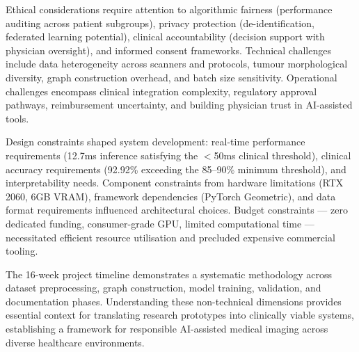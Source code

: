 Ethical considerations require attention to algorithmic fairness (performance auditing across patient subgroups), privacy protection (de-identification, federated learning potential), clinical accountability (decision support with physician oversight), and informed consent frameworks. Technical challenges include data heterogeneity across scanners and protocols, tumour morphological diversity, graph construction overhead, and batch size sensitivity. Operational challenges encompass clinical integration complexity, regulatory approval pathways, reimbursement uncertainty, and building physician trust in AI-assisted tools.

Design constraints shaped system development: real-time performance requirements (12.7ms inference satisfying the $<$50ms clinical threshold), clinical accuracy requirements (92.92\% exceeding the 85--90\% minimum threshold), and interpretability needs. Component constraints from hardware limitations (RTX 2060, 6GB VRAM), framework dependencies (PyTorch Geometric), and data format requirements influenced architectural choices. Budget constraints — zero dedicated funding, consumer-grade GPU, limited computational time — necessitated efficient resource utilisation and precluded expensive commercial tooling.

The 16-week project timeline demonstrates a systematic methodology across dataset preprocessing, graph construction, model training, validation, and documentation phases. Understanding these non-technical dimensions provides essential context for translating research prototypes into clinically viable systems, establishing a framework for responsible AI-assisted medical imaging across diverse healthcare environments.

\clearpage